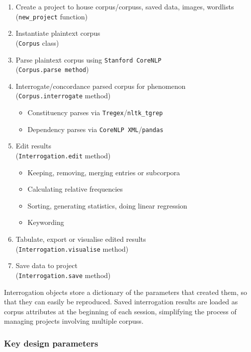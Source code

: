 \begin{enumerate}
    \item Create a project to house corpus\slash \glspl{corpus}, saved data, images, wordlists \\ (\texttt{new\_project} function)
    \item Instantiate plaintext corpus \\ (\texttt{Corpus} class)
    \item Parse plaintext corpus using \texttt{Stanford CoreNLP} \\ (\texttt{Corpus.parse method})
    \item Interrogate\slash concordance parsed corpus for  phenomenon \\ (\texttt{Corpus.interrogate} method)
    \begin{itemize}
        \item Constituency parses via \texttt{Tregex}\slash \texttt{nltk\_tgrep}
        \item Dependency parses via \texttt{CoreNLP XML}\slash \texttt{pandas}
    \end{itemize}
    \item Edit results \\ (\texttt{Interrogation.edit} method)
    \begin{itemize}
        \item Keeping, removing, merging entries or subcorpora
        \item Calculating relative frequencies
        \item Sorting, generating statistics, doing linear regression
        \item Keywording
    \end{itemize}
    \item Tabulate, export or visualise edited results \\ (\texttt{Interrogation.visualise} method)
    \item Save data to project \\ (\texttt{Interrogation.save} method)
\end{enumerate}
%
Interrogation objects store a dictionary of the parameters that created them, so that they can easily be reproduced. Saved interrogation results are loaded as \gls{corpus} attributes at the beginning of each session, simplifying the process of managing projects involving multiple \glspl{corpus}.

\subsubsection{Key design parameters}


